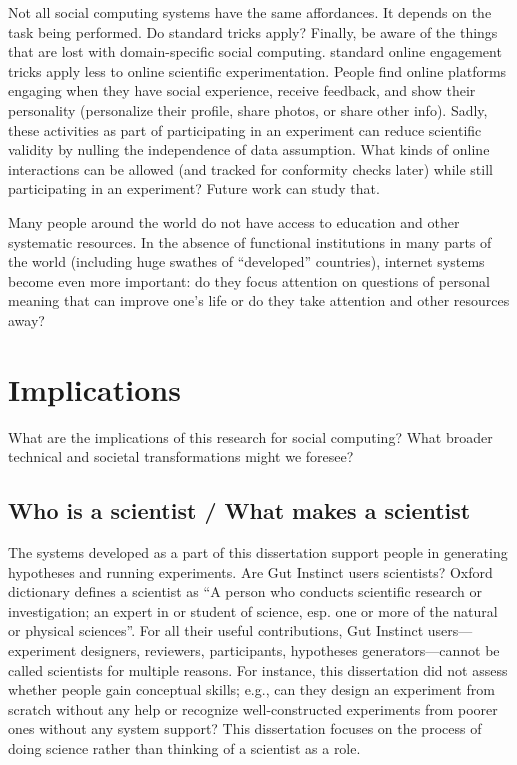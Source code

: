Not all social computing systems have the same affordances. It depends on the task being performed. Do standard tricks apply? Finally, be aware of the things that are lost with domain-specific social computing. standard online engagement tricks apply less to online scientific experimentation. People find online platforms engaging when they have social experience, receive feedback, and show their personality (personalize their profile, share photos, or share other info). Sadly, these activities as part of participating in an experiment can reduce scientific validity by nulling the independence of data assumption. What kinds of online interactions can be allowed (and tracked for conformity checks later) while still participating in an experiment? Future work can study that.

Many people around the world do not have access to education and other systematic resources. In the absence of functional institutions in many parts of the world (including huge swathes of “developed” countries), internet systems become even more important:  do they focus attention on questions of personal meaning that can improve one’s life or do they take attention and other resources away?


\section{Implications}

What are the implications of this research for social computing? What broader technical and societal transformations might we foresee?

\subsection{Who is a scientist / What makes a scientist}
The systems developed as a part of this dissertation support people in generating hypotheses and running experiments. Are Gut Instinct users scientists? Oxford dictionary defines a scientist as “A person who conducts scientific research or investigation; an expert in or student of science, esp. one or more of the natural or physical sciences”. For all their useful contributions, Gut Instinct users---experiment designers, reviewers, participants, hypotheses generators---cannot be called scientists for multiple reasons. For instance, this dissertation did not assess whether people gain conceptual skills; e.g., can they design an experiment from scratch without any help or recognize well-constructed experiments from poorer ones without any system support? This dissertation focuses on the process of doing science rather than thinking of a scientist as a role. 

